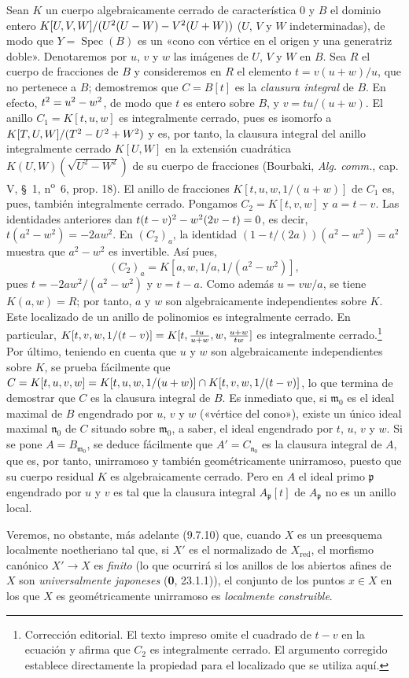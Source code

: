 Sean $K$ un cuerpo algebraicamente cerrado de característica 0
y $B$ el dominio entero
$K[U,V,W]/(U^2(U- W)- V^2(U+W))$
($U$, $V$ y $W$ indeterminadas), de modo que
$Y=\operatorname{Spec}(B)$ es un «cono con vértice en el origen y
una generatriz doble». Denotaremos por $u$, $v$ y $w$ las imágenes
de $U$, $V$ y $W$ en $B$. Sea $R$ el cuerpo de fracciones de $B$
y consideremos en $R$ el elemento $t=v(u+w)/u$, que no pertenece
a $B$; demostremos que $C=B[t]$ es la \emph{clausura integral} de $B$.
En efecto, $t^2=u^2- w^2$, de modo que $t$ es entero sobre $B$,
y $v=tu/(u+w)$. El anillo $C_1=K[t,u,w]$ es integralmente cerrado,
pues es isomorfo a
$K[T,U,W]/(T^2- U^2+W^2)$ y es, por tanto, la clausura integral
del anillo integralmente cerrado $K[U,W]$ en la extensión
cuadrática $K(U,W)(\sqrt{U^2-W^2})$ de su cuerpo de fracciones
(Bourbaki, \emph{Alg. comm.}, cap. V, §~1, n\textsuperscript{o}~6, prop. 18).
El anillo de fracciones $K[t,u,w,1/(u+w)]$ de $C_1$ es,
pues, también integralmente cerrado. Pongamos $C_2=K[t,v,w]$ y $a=t-v$.
Las identidades anteriores dan
$t(t- v)^2- w^2(2v- t)=0$, es decir, $t(a^2-w^2)=-2aw^2$.
En $(C_2)_a$, la identidad $(1-t/(2a))(a^2-w^2)=a^2$ muestra que
$a^2-w^2$ es invertible. Así pues,
\[
(C_2)_a=K[a,w,1/a,1/(a^2-w^2)],
\]
pues $t=-2aw^2/(a^2-w^2)$ y $v=t-a$. Como además $u=vw/a$,
se tiene $K(a,w)=R$; por tanto, $a$ y $w$ son algebraicamente independientes
sobre $K$. Este localizado de un anillo de polinomios es integralmente
cerrado. En particular,
$K[t,v,w,1/(t- v)]=K[t,\frac{tu}{u+w},w,\frac{u+w}{tw}]$ es integralmente cerrado.\footnote{Corrección editorial. El texto impreso omite el cuadrado de $t-v$ en la ecuación y afirma que $C_2$ es integralmente cerrado. El argumento corregido establece directamente la propiedad para el localizado que se utiliza aquí.} Por último, teniendo en cuenta que $u$
y $w$ son algebraicamente independientes sobre $K$, se prueba
fácilmente que
$C=K[t,u,v,w]=K[t,u,w,1/(u+w)]\cap K[t,v,w,1/(t- v)]$,
lo que termina de demostrar que $C$ es la clausura integral de
$B$. Es inmediato que, si $\mathfrak m_0$ es el ideal maximal de
$B$ engendrado por $u$, $v$ y $w$ («vértice del cono»), existe
un único ideal maximal $\mathfrak n_0$ de $C$ situado sobre
$\mathfrak m_0$, a saber, el ideal engendrado por $t$, $u$, $v$
y $w$. Si se pone $A=B_{\mathfrak m_0}$, se deduce fácilmente
que $A'=C_{\mathfrak n_0}$ es la clausura integral de $A$,
que es, por tanto, unirramoso y también geométricamente
unirramoso, puesto que su cuerpo residual $K$ es algebraicamente
cerrado. Pero en $A$ el ideal primo $\mathfrak p$ engendrado por
$u$ y $v$ es tal que la clausura integral $A_\mathfrak p[t]$
de $A_\mathfrak p$ no es un anillo local.

Veremos, no obstante, más adelante (9.7.10) que, cuando $X$ es
un preesquema localmente noetheriano tal que, si $X'$ es el
normalizado de $X_{\mathrm{red}}$, el morfismo canónico
$X'\to X$ es \emph{finito} (lo que ocurrirá si los anillos de los
abiertos afines de $X$ son \emph{universalmente japoneses} (\textbf 0, 23.1.1)),
el conjunto de los puntos $x\in X$ en los que $X$ es
geométricamente unirramoso es \emph{localmente construible}.
